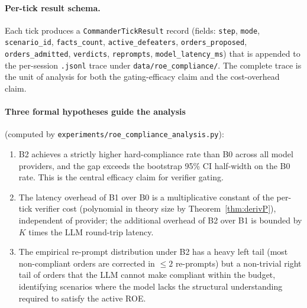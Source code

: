 \documentclass{article}
\theoremstyle{definition}
\begin{document}
\paragraph{Per-tick result schema.} Each tick produces a \texttt{CommanderTickResult} record (fields: \texttt{step}, \texttt{mode}, \texttt{scenario\_id}, \texttt{facts\_count}, \texttt{active\_defeaters}, \texttt{orders\_proposed}, \texttt{orders\_admitted}, \texttt{verdicts}, \texttt{reprompts}, \texttt{model\_latency\_ms}) that is appended to the per-session \texttt{.jsonl} trace under \texttt{data/roe\_compliance/}. The complete trace is the unit of analysis for both the gating-efficacy claim and the cost-overhead claim.

\paragraph{Three formal hypotheses guide the analysis} (computed by \texttt{experiments/roe\_compliance\_analysis.py}):
\begin{enumerate}[label=(H\textsubscript{\textsc{\arabic*}}),nosep,leftmargin=4em]
    \item[$\mathbf{H_{GATE}}$] B2 achieves a strictly higher hard-compliance rate than B0 across all model providers, and the gap exceeds the bootstrap 95\% CI half-width on the B0 rate. This is the central efficacy claim for verifier gating.
    \item[$\mathbf{H_{COST}}$] The latency overhead of B1 over B0 is a multiplicative constant of the per-tick verifier cost (polynomial in theory size by Theorem~\ref{thm:derivP}), independent of provider; the additional overhead of B2 over B1 is bounded by $K$ times the LLM round-trip latency.
    \item[$\mathbf{H_{REPROMPT}}$] The empirical re-prompt distribution under B2 has a heavy left tail (most non-compliant orders are corrected in $\leq 2$ re-prompts) but a non-trivial right tail of orders that the LLM cannot make compliant within the budget, identifying scenarios where the model lacks the structural understanding required to satisfy the active ROE.
\end{enumerate}
\end{document}
